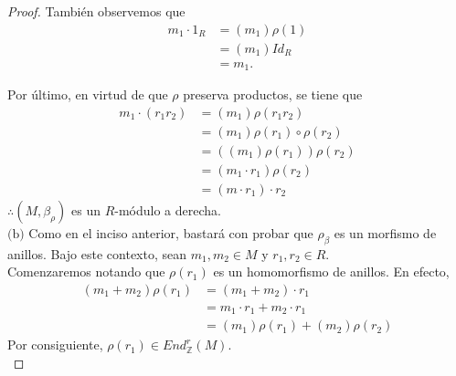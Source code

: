 \documentclass{article}
\newcommand{\lrprth}[1]{
	\left(#1\right)
}
\newcommand{\zend}[2]{
	End_{\mathbb{Z}}^{#2}\lrprth{#1}
}
\theoremstyle{definition}
\theoremstyle{plain}
\theoremstyle{plain}
\theoremstyle{definition}
\theoremstyle{definition}
\theoremstyle{definition}
\theoremstyle{definition}
\theoremstyle{definition}
\theoremstyle{definition}
\begin{document}
\begin{enumerate}[label=\textbf{Ej \arabic*.}]
\begin{proof}
			También observemos que
			\begin{align*}
				m_{1} \cdot 1_{R}&=\lrprth{m_{1}} \rho \lrprth{1}\\
				&=\lrprth{m_{1}}Id_{R}\\
				&=m_{1}.
			\end{align*}
			
			Por último, en virtud de que $\rho$ preserva productos, se tiene que
			\begin{align*}
				m_{1} \cdot \lrprth{r_{1}r_{2}}&=\lrprth{m_{1}} \rho \lrprth{r_{1}r_{2}}\\
				&=\lrprth{m_{1}} \rho \lrprth{r_{1}} \circ \rho \lrprth{r_{2}}\\
				&=\lrprth{\lrprth{m_{1}} \rho \lrprth{r_{1}}} \rho \lrprth{r_{2}}\\
				&=\lrprth{m_{1} \cdot r_{1}} \rho \lrprth{r_{2}}\\
				&=\lrprth{m \cdot r_{1}} \cdot r_{2}
			\end{align*}
			$\therefore\lrprth{M, \beta_{\rho}}$ es un $R$-módulo a derecha.\\
			
			$\boxed{\text{(b)}}$ Como en el inciso anterior, bastará con probar que $\rho_{\beta}$ es un morfismo de anillos. Bajo este contexto, sean $m_{1},m_{2} \in M$ y $r_{1},r_{2} \in R$.\\
			
			Comenzaremos notando que $\rho \lrprth{r_{1}}$ es un homomorfismo de anillos. En efecto,
			\begin{align*}
				\lrprth{m_{1}+m_{2}} \rho \lrprth{r_{1}}&=\lrprth{m_{1}+m_{2}} \cdot r_{1}\\
				&=m_{1} \cdot r_{1} + m_{2} \cdot r_{1}\\
				&=\lrprth{m_{1}} \rho \lrprth{r_{1}} + \lrprth{m_{2}} \rho \lrprth{r_{2}}
			\end{align*}
			Por consiguiente, $\rho\lrprth{r_{1}}\in\zend{M}{r}$.\\
			

\end{proof}
\end{enumerate}
\end{document}
